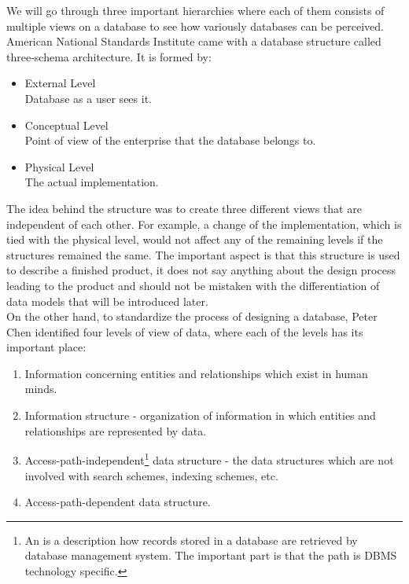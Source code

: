 We will go through three important hierarchies where each of them consists of multiple views on a database to see how variously databases can be perceived.\\

American National Standards Institute \cite{ANSIArchitecture75} came with a database structure called three-schema architecture. It is formed by:
\begin{itemize}
	\item External Level \\ Database as a user sees it. 
	\item Conceptual Level \\ Point of view of the enterprise that the database belongs to.
	\item Physical Level \\ The actual implementation.
\end{itemize}

The idea behind the structure was to create three different views that are independent of each other. 
For example, a change of the implementation, which is tied with the physical level, would not affect any of the remaining levels if the structures remained the same. 
The important aspect is that this structure is used to describe a finished product, it does not say anything about the design process leading to the product and should not be mistaken with the differentiation of data models that will be introduced later.\\

On the other hand, to standardize the process of designing a database, Peter Chen \cite{Chen76theentity-relationship} identified four levels of view of data, where each of the levels has its important place: \\
\begin{enumerate}
	\item Information concerning entities and relationships which exist in human minds.
	\item Information structure - organization of information in which entities and relationships are represented by data.
	\item Access-path-independent\footnote{An  is a description how records stored in a database are retrieved by database management system\cite{AccessPathDefiniton}. The important part is that the path is DBMS technology specific.} data structure - the data structures which are not involved with search schemes, indexing schemes, etc.
	\item Access-path-dependent data structure.
\end{enumerate}


